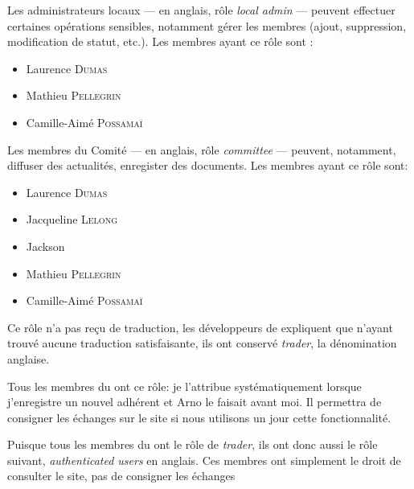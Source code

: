 \label{sec:adminLocal}
Les administrateurs locaux --- en anglais, rôle \emph{local admin} --- peuvent effectuer certaines opérations sensibles, notamment gérer les membres (ajout, suppression, modification de statut, etc.). Les membres ayant ce rôle sont :

\begin{itemize}
    \item Laurence \textsc{Dumas}
    \item Mathieu \textsc{Pellegrin}
    \item Camille-Aimé \textsc{Possamaï}
\end{itemize}

\label{sec:comite}

Les membres du Comité --- en anglais, rôle \emph{committee} ---  peuvent, notamment, diffuser des actualités, enregister des documents. Les membres ayant ce rôle sont:

\begin{itemize}
    \item Laurence \textsc{Dumas}
    \item Jacqueline \textsc{Lelong}
    \item Jackson 
    \item Mathieu \textsc{Pellegrin}
    \item Camille-Aimé \textsc{Possamaï}
\end{itemize}

\label{sec:trader}

Ce rôle n'a pas reçu de traduction, les développeurs de \CF expliquent que n'ayant trouvé aucune traduction satisfaisante, ils ont conservé  \emph{trader}, la dénomination anglaise.

Tous les membres du \CdS ont ce rôle: je l'attribue systématiquement lorsque j'enregistre un nouvel adhérent et Arno le faisait avant moi. Il permettra de consigner les échanges sur le site si nous utilisons un jour cette fonctionnalité.


Puisque tous les membres du \CdS ont le rôle de \emph{trader}, ils ont donc aussi le rôle suivant, \emph{authenticated users} en anglais. Ces membres ont simplement le droit de consulter le site, pas de consigner les échanges%

